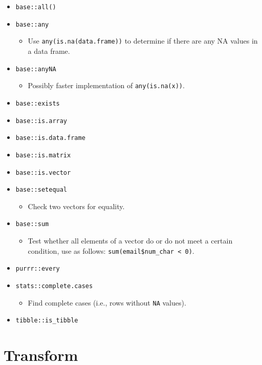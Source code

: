 \documentclass[
]{book}
\providecommand{\tightlist}{%
  \setlength{\itemsep}{0pt}\setlength{\parskip}{0pt}}
\begin{document}
\begin{itemize}
\tightlist
\item
  \texttt{base::all()}
\item
  \texttt{base::any}

  \begin{itemize}
  \tightlist
  \item
    Use \texttt{any(is.na(data.frame))} to determine if there are any NA values in a data frame.
  \end{itemize}
\item
  \texttt{base::anyNA}

  \begin{itemize}
  \tightlist
  \item
    Possibly faster implementation of \texttt{any(is.na(x))}.
  \end{itemize}
\item
  \texttt{base::exists}
\item
  \texttt{base::is.array}
\item
  \texttt{base::is.data.frame}
\item
  \texttt{base::is.matrix}
\item
  \texttt{base::is.vector}
\item
  \texttt{base::setequal}

  \begin{itemize}
  \tightlist
  \item
    Check two vectors for equality.
  \end{itemize}
\item
  \texttt{base::sum}

  \begin{itemize}
  \tightlist
  \item
    Test whether all elements of a vector do or do not meet a certain condition, use as follows: \texttt{sum(email\$num\_char\ \textless{}\ 0)}.
  \end{itemize}
\item
  \texttt{purrr::every}
\item
  \texttt{stats::complete.cases}

  \begin{itemize}
  \tightlist
  \item
    Find complete cases (i.e., rows without \texttt{NA} values).
  \end{itemize}
\item
  \texttt{tibble::is\_tibble}
\end{itemize}

\hypertarget{transform}{%
\chapter{Transform}\label{transform}}
\end{document}
